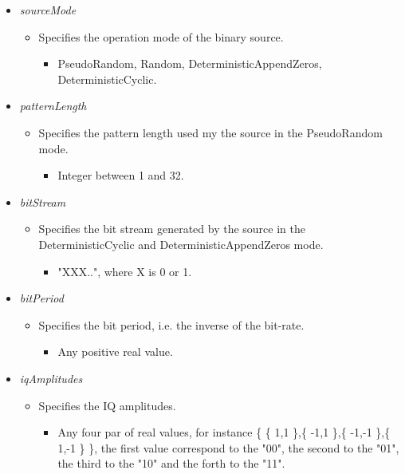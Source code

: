  \begin{itemize}

   \item  \emph{sourceMode}
   \begin{itemize}
     \item  Specifies the operation mode of the binary source.
     \begin{itemize}
       \item  PseudoRandom, Random, DeterministicAppendZeros, DeterministicCyclic.
     \end{itemize}
   \end{itemize}

   \item  \emph{patternLength}
   \begin{itemize}
     \item  Specifies the pattern length used my the source in the PseudoRandom mode.
     \begin{itemize}
       \item  Integer between 1 and 32.
     \end{itemize}
   \end{itemize}

    \item  \emph{bitStream}
   \begin{itemize}
     \item  Specifies the bit stream generated by the source in the DeterministicCyclic and DeterministicAppendZeros mode.
     \begin{itemize}
       \item  "XXX..", where X is 0 or 1.
     \end{itemize}
   \end{itemize}

    \item  \emph{bitPeriod}
   \begin{itemize}
     \item  Specifies the bit period, i.e. the inverse of the bit-rate.
     \begin{itemize}
       \item  Any positive real value.
     \end{itemize}
   \end{itemize}

   \item  \emph{iqAmplitudes}
   \begin{itemize}
     \item  Specifies the IQ amplitudes.
     \begin{itemize}
       \item Any four par of real values, for instance \{ \{ 1,1 \},\{ -1,1 \},\{ -1,-1 \},\{ 1,-1 \} \}, the first value correspond to the "00", the second to the "01", the third to the "10" and the forth to the "11".
     \end{itemize}
   \end{itemize}


\end{itemize}
